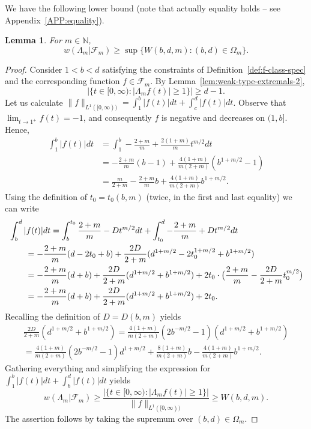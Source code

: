 \documentclass[a4paper]{amsart} %
\newtheorem{lemma}[theorem]{Lemma}
\theoremstyle{definition}
\theoremstyle{remark}
\numberwithin{equation}{section}
\newcommand*{\LongArxivOrShortJournalVersion}[2]{#1}
\newcommand*{\NNone}{\mathbb{N}}
\newcommand*{\weakconstrestricted}[2]{w(#1|#2)} %
\newcommand*{\fclassspec}[1]{\mathcal{F}_{#1}}
\newcommand*{\dOne}{D}%
\newcommand*{\specialbd}[1]{\Omega_{#1}}
\newcommand*{\XXXspecialbd}{W}
\begin{document}
We have the following lower bound
(note that actually equality  holds -- see \LongArxivOrShortJournalVersion{Appendix~\ref{APP:equality}}{Appendix~A in the arXiv version of this paper}).


\begin{lemma}
	\label{lem:lower-bound-fixed-m-special-b-c-d-alternate-expression-with-inequality}
	For $m\in\NNone$,
	\begin{equation*}
	\weakconstrestricted{\Lambda_m}{\fclassspec{m}} 
	  \geq 
	\sup\bigl\{
	\XXXspecialbd(b,d,m) : (b,d)\in\specialbd{m} \bigr\}.
	\end{equation*}
\end{lemma}

\begin{proof}
	Consider $1 < b <d$ satisfying the constraints of  Definition~\ref{def:f-class-spec}
	and the corresponding function  $f\in\fclassspec{m}$. 
	By Lemma~\ref{lem:weak-type-extremals-2},
		\[
			\bigl|\{t\in[0,\infty) : |\Lambda_m f(t)|\geq 1\} \bigr| \geq d-1.
	    \]
		Let us calculate $\|f\|_{L^1([0, \infty))} = \int_1^b |f(t)| dt +\int_c^d |f(t)| dt$.
		Observe that $\lim_{t\to 1^+} f(t) = -1 $, and consequently $f$ is negative and decreases on $(1,b]$.
		Hence,
		\begin{align*}
		\int_1^b |f(t)| dt &= \int_1^b  - \frac{2+m}{m} +\frac{2(1+m)}{m} t^{m/2} dt  \\
		&= - \frac{2+m}{m}(b-1) + \frac{4(1+m)}{m(2+m)} (b^{1+m/2} - 1)\\
		&= \frac{m}{2+m} - \frac{2+m}{m}b + \frac{4(1+m)}{m(2+m)} b^{1+m/2}.
		\end{align*}
	Using the definition of $t_0 = t_0(b,m)$ 
	(twice, in the first and last equality) we can write
	\begin{align*}
	\MoveEqLeft[2]
	\int_b^d |f(t)| dt
	= \int_{b}^{t_0} \frac{2+m}{m} - \dOne t^{m/2}  dt 
	+  \int_{t_0}^d -\frac{2+m}{m} + \dOne t^{m/2}  dt \\
	&= -\frac{2+m}{m}(d-2t_0 + b) + \frac{2\dOne}{2+m} (d^{1+m/2} - 2 t_0^{1+m/2} + b^{1+m/2}) \\
	&=  -\frac{2+m}{m}(d+ b) + \frac{2\dOne}{2+m} (d^{1+m/2} + b^{1+m/2}) +2t_0 \cdot \bigl( \frac{2+m}{m} -  \frac{2\dOne}{2+m} t_0^{m/2} \bigr)  \\
	&=  -\frac{2+m}{m}(d+ b) + \frac{2\dOne}{2+m}(d^{1+m/2} + b^{1+m/2})+ 2t_0.
	\end{align*}
	Recalling the definition of $\dOne = \dOne(b,m)$ yields
	\begin{multline*}
	\frac{2\dOne}{2+m} (d^{1+m/2} + b^{1+m/2}) 
	= \frac{4(1+m)}{m(2+m)}(2b^{-m/2}  -1)(d^{1+m/2} + b^{1+m/2})\\
	=\frac{4(1+m)}{m(2+m)}(2b^{-m/2}  -1)d^{1+m/2} 
	+\frac{8(1+m)}{m(2+m)} b  - \frac{4(1+m)}{m(2+m)} b^{1+m/2}.
	\end{multline*}
	Gathering everything and simplifying the expression for $\int_1^b |f(t)| dt+ \int_{b}^d |f(t)| dt$ 
	yields
	\[
	\weakconstrestricted{\Lambda_m}{\fclassspec{m}} 
	\geq \frac{\bigl|\{t\in[0,\infty) : |\Lambda_m f(t)|\geq 1\} \bigr|}{\|f\|_{L^1([0, \infty))} } \geq 
	\XXXspecialbd(b,d,m).
	\]
	The assertion follows by taking the supremum over $(b,d)\in \specialbd{m}$.
\end{proof}
\end{document}
